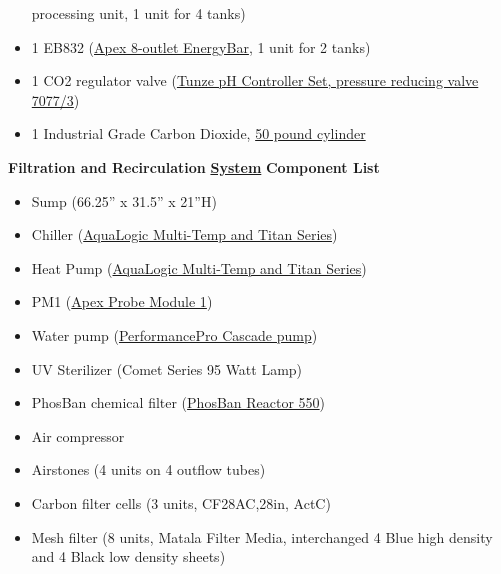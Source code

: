 \documentclass[]{book}
\providecommand{\tightlist}{%
  \setlength{\itemsep}{0pt}\setlength{\parskip}{0pt}}
\begin{document}
\begin{itemize}
  processing unit, 1 unit for 4 tanks)\\
\item
  1 EB832
  (\href{https://github.com/SilbigerLab/Mesocosm_User_Manual/blob/master/Manuals/EB832_Guide.pdf}{Apex
  8-outlet EnergyBar}, 1 unit for 2 tanks)\\
\item
  1 CO2 regulator valve
  (\href{https://github.com/SilbigerLab/Mesocosm_User_Manual/blob/master/Manuals/Tunze_CO2_Regulator.pdf}{Tunze
  pH Controller Set, pressure reducing valve 7077/3})\\
\item
  1 Industrial Grade Carbon Dioxide,
  \href{https://www.airgas.com/product/Gases/Industrial-Application-Gases/Carbon-Dioxide---Industrial/p/CD\%2050}{50
  pound cylinder}
\end{itemize}

 \textbf{Filtration and Recirculation}
\href{https://github.com/SilbigerLab/Mesocosm_User_Manual/blob/master/Manuals/Filtration_Skid_Build_Package.pdf}{\textbf{System}}
\textbf{Component List}

\begin{itemize}
\tightlist
\item
  Sump (66.25'' x 31.5'' x 21''H)\\
\item
  Chiller
  (\href{https://github.com/SilbigerLab/Mesocosm_User_Manual/blob/master/Manuals/AquaLogic_Chiller.pdf}{AquaLogic
  Multi-Temp and Titan Series})\\
\item
  Heat Pump
  (\href{https://github.com/SilbigerLab/Mesocosm_User_Manual/blob/master/Manuals/AquaLogic_Chiller.pdf}{AquaLogic
  Multi-Temp and Titan Series})\\
\item
  PM1
  (\href{https://github.com/SilbigerLab/Mesocosm_User_Manual/blob/master/Manuals/PM1_manual.pdf}{Apex
  Probe Module 1})\\
\item
  Water pump
  (\href{https://github.com/SilbigerLab/Mesocosm_User_Manual/blob/master/Manuals/Complete_Cascade.pdf}{PerformancePro
  Cascade pump})\\
\item
  UV Sterilizer (Comet Series 95 Watt Lamp)\\
\item
  PhosBan chemical filter
  (\href{https://github.com/SilbigerLab/Mesocosm_User_Manual/blob/master/Manuals/Phosban_Reactor.pdf}{PhosBan
  Reactor 550})\\
\item
  Air compressor\\
\item
  Airstones (4 units on 4 outflow tubes)\\
\item
  Carbon filter cells (3 units, CF28AC,28in, ActC)\\
\item
  Mesh filter (8 units, Matala Filter Media, interchanged 4 Blue high
  density and 4 Black low density sheets)
\end{itemize}
\end{document}
